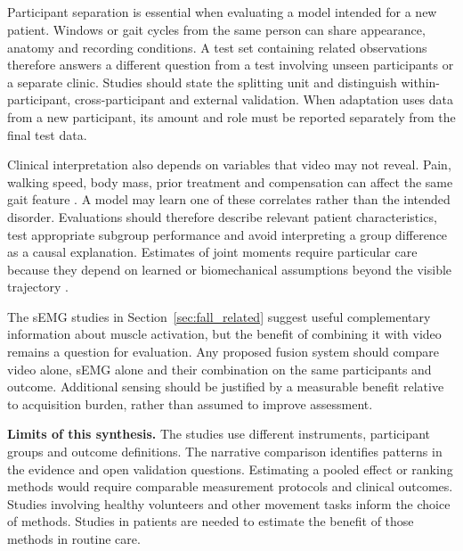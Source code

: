 \documentclass[12pt,nopreprintline]{elsarticle}
\begin{document}
\subsection{}
\begin{revision}
Participant separation is essential when evaluating a model intended for a new patient. Windows or gait cycles from the same person can share appearance, anatomy and recording conditions. A test set containing related observations therefore answers a different question from a test involving unseen participants or a separate clinic. Studies should state the splitting unit and distinguish within-participant, cross-participant and external validation. When adaptation uses data from a new participant, its amount and role must be reported separately from the final test data.

Clinical interpretation also depends on variables that video may not reveal. Pain, walking speed, body mass, prior treatment and compensation can affect the same gait feature \cite{bejek2006influence,harding2012body,ro2019effects,bacon2022relation}. A model may learn one of these correlates rather than the intended disorder. Evaluations should therefore describe relevant patient characteristics, test appropriate subgroup performance and avoid interpreting a group difference as a causal explanation. Estimates of joint moments require particular care because they depend on learned or biomechanical assumptions beyond the visible trajectory \cite{boswell2021neural}.

The sEMG studies in Section~\ref{sec:fall_related} suggest useful complementary information about muscle activation, but the benefit of combining it with video remains a question for evaluation. Any proposed fusion system should compare video alone, sEMG alone and their combination on the same participants and outcome. Additional sensing should be justified by a measurable benefit relative to acquisition burden, rather than assumed to improve assessment.

\noindent\textbf{Limits of this synthesis.} The studies use different instruments, participant groups and outcome definitions. The narrative comparison identifies patterns in the evidence and open validation questions. Estimating a pooled effect or ranking methods would require comparable measurement protocols and clinical outcomes. Studies involving healthy volunteers and other movement tasks inform the choice of methods. Studies in patients are needed to estimate the benefit of those methods in routine care.
\end{revision}
\end{document}
